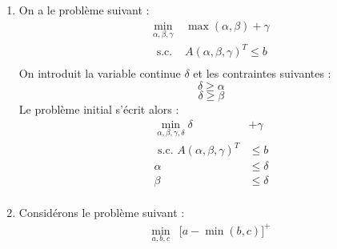 \documentclass[a4paper,12pt]{article}
\begin{document}
\begin {enumerate}
{\begin{equation}
        \begin{aligned}
            \min _{\alpha, \beta, y_\alpha, y_\beta, y} & y \\
            \text{ s.c. } 
            &y \leq &\alpha \\
            &y \leq &\beta \\
            &y \geq &\alpha - 2M y_\alpha \\
            &y \geq &\beta - 2M y_\beta \\
            &y_\alpha + y_\beta &= 1 \\
        \end{aligned}
    \end{equation}
    La contrainte $y_\alpha + y_\beta = 1$ assure que l'un des $y_\alpha$ ou $y_\beta$ vaut zéro,
     c'est-à-dire que l'on a bien $y$ qui prend la valeur $\alpha$ ou $\beta$.
    De plus, puisque c'est un problème de minimisation, on a bien $y = min(\alpha, \beta)$.
    (J'ai pu trouver cette élégante méthode dans https://doi.org/10.3390/math10020283)
}
\\
\item {
    On a le problème suivant : 
    \begin{equation}
        \begin{aligned}
            \min _{\alpha, \beta, \gamma} & \max (\alpha, \beta) + \gamma \\
            \text{ s.c. } & A(\alpha, \beta, \gamma)^T \leq b \\
        \end{aligned}
    \end{equation}
    On introduit la variable continue $\delta$ et les contraintes suivantes :
    $$ \delta \geq \alpha $$
    $$ \delta \geq \beta $$
    Le problème initial s'écrit alors :
    \begin{equation}
        \begin{aligned}
            \min _{\alpha, \beta, \gamma, \delta}  \delta &+ \gamma \\
            \text{ s.c. }  A(\alpha, \beta, \gamma)^T &\leq b \\
            \alpha &\leq \delta \\
            \beta &\leq \delta \\
        \end{aligned}
    \end{equation}
}

\item{
    Considérons le problème suivant :
    \begin{equation}
        \begin{aligned}
            \min _{a, b, c} & \lbrack a - \min(b, c) \rbrack^+ \\
        \end{aligned}
        \label{linmin}
    \end{equation}

}
\end{enumerate}
\end{document}
